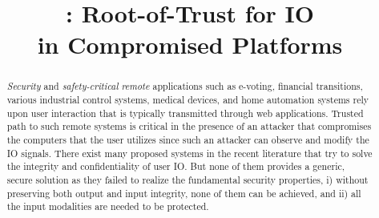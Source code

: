 \newif\ifccs
\ccsfalse

\ifccs

\else

\fi



\newif\ifdesperatetime

\graphicspath{{images/}}


\title{\name: Root-of-Trust for IO \\ in Compromised Platforms}

\ifccs
\else
\maketitle
\fi

\thispagestyle{plain}
\pagestyle{plain}

\begin{abstract}
 

\emph{Security} and \emph{safety-critical} \emph{remote} applications such as e-voting, financial transitions, various industrial control systems, medical devices, and home automation systems rely upon user interaction that is typically transmitted through web applications. Trusted path to such remote systems is critical in the presence of an attacker that compromises the computers that the user utilizes since such an attacker can observe and modify the IO signals. There exist many proposed systems in the recent literature that try to solve the integrity and confidentiality of user IO. But none of them provides a generic, secure solution as they failed to realize the fundamental security properties, i) without preserving both output and input integrity, none of them can be achieved, and ii) all the input modalities are needed to be protected.    


\end{abstract}
